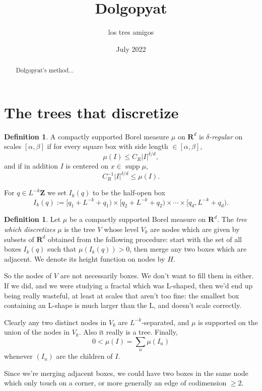 \documentclass[reqno,10pt]{amsart}
\title{Dolgopyat}
\author{los tres amigos}
\date{July 2022}
\newcommand{\ZZ}{\mathbf{Z}}
\newcommand{\RR}{\mathbf{R}}
\DeclareMathOperator{\supp}{supp}
\newcommand{\dfn}[1]{\emph{#1}\index{#1}}
\theoremstyle{definition}
\newtheorem{definition}[theorem]{Definition}
\numberwithin{equation}{section}
\begin{document}
\begin{abstract}
    Dolgopyat's method...
\end{abstract}

\maketitle



\section{The trees that discretize}
\begin{definition}
A compactly supported Borel measure $\mu$ on $\RR^d$ is \dfn{$\delta$-regular} on scales $[\alpha, \beta]$ if for every square box with side length $\in [\alpha, \beta]$,
$$\mu(I) \leq C_R |I|^{\delta/d},$$
and if in addition $I$ is centered on $x \in \supp \mu$,
$$C_R^{-1} |I|^{\delta/d} \leq \mu(I).$$
\end{definition}

For $q \in L^{-k} \ZZ$ we set $I_k(q)$ to be the half-open box
$$I_k(q) := [q_1 + L^{-k} + q_1) \times [q_2 + L^{-k} + q_2) \times \cdots \times [q_d, L^{-k} + q_d).$$

\begin{definition}
Let $\mu$ be a compactly supported Borel measure on $\RR^d$.
The \dfn{tree which discretizes} $\mu$ is the tree $V$ whose level $V_k$ are nodes which are given by subsets of $\RR^d$ obtained from the following procedure: start with the set of all boxes $I_k(q)$ such that $\mu(I_k(q)) > 0$, then merge any two boxes which are adjacent.
We denote its height function on nodes by $H$.
\end{definition}

So the nodes of $V$ are not necessarily boxes. We don't want to fill them in either.
If we did, and we were studying a fractal which was L-shaped, then we'd end up being really wasteful, at least at scales that aren't too fine: the smallest box containing an L-shape is much larger than the L, and doesn't scale correctly.

Clearly any two distinct nodes in $V_k$ are $L^{-k}$-separated, and $\mu$ is supported on the union of the nodes in $V_k$.
Also it really is a tree. Finally,
$$0 < \mu(I) = \sum_n \mu(I_n)$$
whenever $(I_n)$ are the children of $I$.

Since we're merging adjacent boxes, we could have two boxes in the same node which only touch on a corner, or more generally an edge of codimension $\geq 2$.
\end{document}
